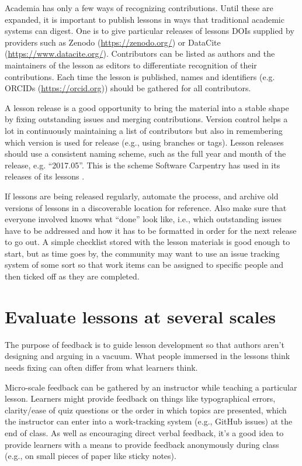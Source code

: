 \documentclass[10pt,letterpaper]{article}
\newcommand{\rulemajor}[1]{\section{#1}}
\begin{document}
Academia has only a few ways of recognizing contributions.
Until these are expanded,
it is important to publish lessons in ways that traditional academic systems can digest.
One is to give particular releases of lessons
DOIs supplied by providers such as Zenodo (\url{https://zenodo.org/})
or DataCite (\url{https://www.datacite.org/}).
Contributors can be listed as authors
and the maintainers of the lesson as editors
to differentiate recognition of their contributions.
Each time the lesson is published,
names and identifiers (e.g. ORCIDs (\url{https://orcid.org}))
should be gathered for all contributors.

A lesson release is a good opportunity to bring the material into a stable shape
by fixing outstanding issues and merging contributions.
Version control helps a lot in continuously maintaining a list of contributors
but also in remembering which version is used for release
(e.g., using branches or tags).
Lesson releases should use a consistent naming scheme,
such as the full year and month of the release,
e.g. ``2017.05''.
This is the scheme Software Carpentry has used in
its releases of its lessons \cite{shell2015,shell2017}.

If lessons are being released regularly,
automate the process,
and archive old versions of lessons in a discoverable location for reference.
Also make sure that everyone involved knows what ``done'' look like,
i.e.,
which outstanding issues have to be addressed
and how it has to be formatted
in order for the next release to go out.
A simple checklist stored with the lesson materials is good enough to start,
but as time goes by,
the community may want to use an issue tracking system of some sort
so that work items can be assigned to specific people
and then ticked off as they are completed.

\rulemajor{Evaluate lessons at several scales}

The purpose of feedback is to guide lesson development
so that authors aren't designing and arguing in a vacuum.
What people immersed in the lessons think needs fixing
can often differ from what learners think.

Micro-scale feedback can be gathered by an instructor while teaching a particular lesson.
Learners might provide feedback on things like typographical errors,
clarity/ease of quiz questions or the order in which topics are presented,
which the instructor can enter into a work-tracking system (e.g., GitHub issues) at the end of class.
As well as encouraging direct verbal feedback,
it's a good idea to provide learners with a means to provide feedback anonymously during class
(e.g., on small pieces of paper like sticky notes).
\end{document}
